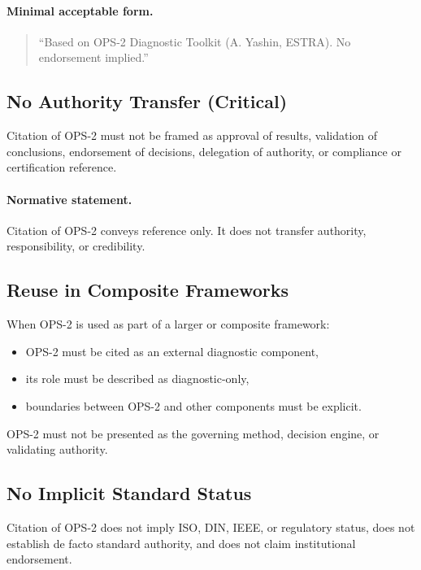 \paragraph{Minimal acceptable form.}
\begin{quote}
``Based on OPS-2 Diagnostic Toolkit (A. Yashin, ESTRA).
No endorsement implied.''
\end{quote}

\subsection{No Authority Transfer (Critical)}
Citation of OPS-2 must not be framed as approval of results, validation of conclusions, endorsement of decisions, delegation of authority, or compliance or certification reference.

\paragraph{Normative statement.}
Citation of OPS-2 conveys reference only.
It does not transfer authority, responsibility, or credibility.

\subsection{Reuse in Composite Frameworks}
When OPS-2 is used as part of a larger or composite framework:
\begin{itemize}
  \item OPS-2 must be cited as an external diagnostic component,
  \item its role must be described as diagnostic-only,
  \item boundaries between OPS-2 and other components must be explicit.
\end{itemize}

OPS-2 must not be presented as the governing method, decision engine, or validating authority.

\subsection{No Implicit Standard Status}
Citation of OPS-2 does not imply ISO, DIN, IEEE, or regulatory status, does not establish de facto standard authority, and does not claim institutional endorsement.
